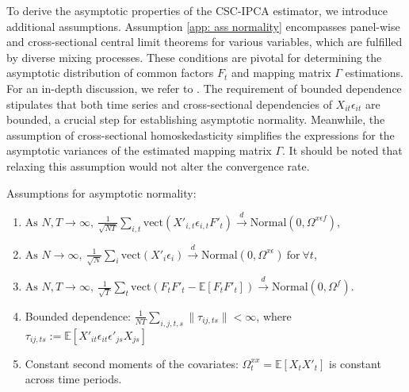 \documentclass[12pt]{article}
\begin{document}
To derive the asymptotic properties of the CSC-IPCA estimator, we introduce additional assumptions. Assumption \ref{app: ass normality} encompasses panel-wise and cross-sectional central limit theorems for various variables, which are fulfilled by diverse mixing processes. These conditions are pivotal for determining the asymptotic distribution of common factors $F_t$ and mapping matrix $\Gamma$ estimations. For an in-depth discussion, we refer to \cite{kelly2020instrumented}. The requirement of bounded dependence stipulates that both time series and cross-sectional dependencies of $X_{it}\epsilon_{it}$ are bounded, a crucial step for establishing asymptotic normality. Meanwhile, the assumption of cross-sectional homoskedasticity simplifies the expressions for the asymptotic variances of the estimated mapping matrix $\Gamma$. It should be noted that relaxing this assumption would not alter the convergence rate.
\begin{assumption}
Assumptions for asymptotic normality:
\begin{enumerate}
    \item $\text{As } N, T \to \infty, \: \frac{1}{\sqrt{NT}} \sum_{i,t} \text{vect}\left( X'_{i,t} \epsilon_{i,t} F'_{t} \right) \xrightarrow{d} \text{Normal} \left(0, \Omega^{x\epsilon f} \right)$,
    
    \item $\text{As } N \to \infty, \: \frac{1}{\sqrt{N}} \sum_{i} \text{vect}\left( X'_{i} \epsilon_{i} \right) \xrightarrow{d} \text{Normal} \left(0, \Omega^{x\epsilon} \right) \: \text{for} \: \forall t$,
    
    \item $\text{As } N, T \to \infty, \: \frac{1}{\sqrt{T}} \sum_{t} \text{vect}\left( F_{t}F'_{t} - \mathbb{E}[F_{t}F'_{t}] \right) \xrightarrow{d} \text{Normal} \left(0, \Omega^{f} \right)$.
    
    \item Bounded dependence: $\frac{1}{NT} \sum_{i,j,t,s}\|\tau_{ij, ts}\| < \infty$, where $\tau_{ij, ts} := \mathbb{E} \left[ X'_{it} \epsilon_{it} \epsilon'_{js} X_{js} \right]$
    
    \item Constant second moments of the covariates: $\Omega_t^{xx} = \mathbb{E}\left[ X_{t} X'_{t} \right]$ is constant across time periods.
    \end{enumerate}
    \label{app: ass normality}
\end{assumption}
\end{document}
